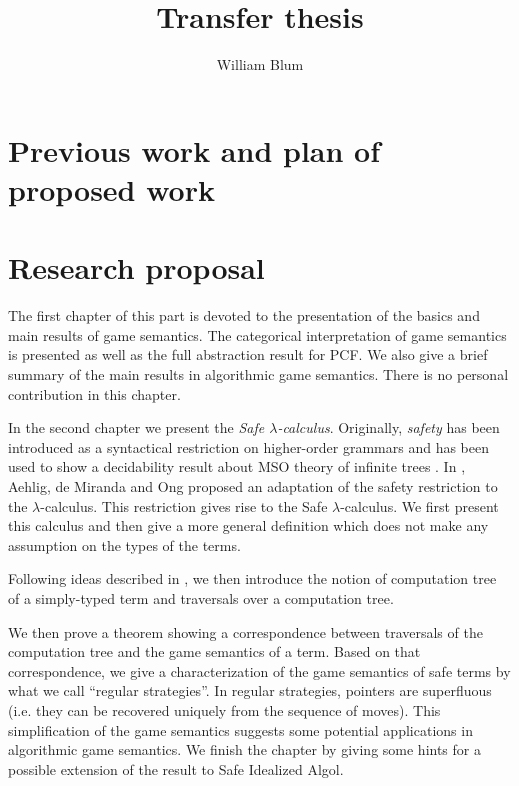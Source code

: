 \documentclass[nocenter,sfbold]{thesis}
\author{William Blum}
\title{Transfer thesis}
\begin{document}
\maketitle \tableofcontents

\part{Previous work and plan of proposed work}




\part{Research proposal}

The first chapter of this part is devoted to the presentation of the
basics and main results of game semantics. The categorical
interpretation of game semantics is presented as well as the full
abstraction result for PCF. We also give a brief summary of the main
results in algorithmic game semantics. There is no personal
contribution in this chapter.

In the second chapter we present the \emph{Safe $\lambda$-calculus}.
Originally, \emph{safety} has been introduced as a syntactical
restriction on higher-order grammars and has been used to show a
decidability result about MSO theory of infinite trees
\citep{KNU02}. In \cite{safety-mirlong2004}, Aehlig, de Miranda and
Ong  proposed an adaptation of the safety restriction to the
$\lambda$-calculus. This restriction gives rise to the Safe
$\lambda$-calculus. We first present this calculus and then give a
more general definition which does not make any assumption on the
types of the terms.

Following ideas described in \cite{OngLics2006}, we then introduce
the notion of computation tree of a simply-typed term and traversals
over a computation tree.

We then prove a theorem showing a correspondence between traversals
of the computation tree and the game semantics of a term. Based on
that correspondence, we give a characterization of the game
semantics of safe terms by what we call ``regular strategies''. In
regular strategies, pointers are superfluous (i.e. they can be
recovered uniquely from the sequence of moves). This simplification
of the game semantics suggests some potential applications in
algorithmic game semantics. We finish the chapter by giving some
hints for a possible extension of the result to Safe Idealized
Algol.
\end{document}
